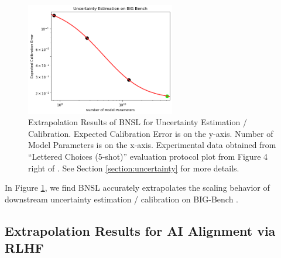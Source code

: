\documentclass{article} %
\begin{document}
\begin{figure}[htbp]
    \centering
\includegraphics[width=0.58\textwidth]{figures/uncertainty/uncertainty.png}
    \caption{
Extrapolation Results of BNSL for Uncertainty Estimation / Calibration. Expected Calibration Error is on the y-axis. Number of Model Parameters is on the x-axis. Experimental data obtained from ``Lettered Choices (5-shot)'' evaluation protocol plot from Figure 4 right of \cite{kadavath2022language}. See Section \ref{section:uncertainty} for more details.
    }
    \label{fig:uncertainty}
\end{figure}

In Figure \ref{fig:uncertainty}, we find BNSL accurately extrapolates the scaling behavior of downstream uncertainty estimation / calibration on BIG-Bench \citep{srivastava2022beyond}.

\clearpage

\subsection{Extrapolation Results for AI Alignment via RLHF}
\label{section:ai_alignment}
\end{document}
